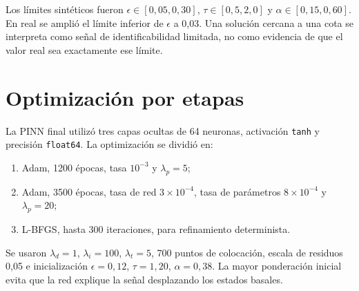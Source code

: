 Los límites sintéticos fueron $\epsilon\in[0{,}05,0{,}30]$, $\tau\in[0{,}5,2{,}0]$ y $\alpha\in[0{,}15,0{,}60]$. En real se amplió el límite inferior de $\epsilon$ a 0,03. Una solución cercana a una cota se interpreta como señal de identificabilidad limitada, no como evidencia de que el valor real sea exactamente ese límite.

\section{Optimización por etapas}
La PINN final utilizó tres capas ocultas de 64 neuronas, activación \texttt{tanh} y precisión \texttt{float64}. La optimización se dividió en:
\begin{enumerate}
  \item Adam, 1200 épocas, tasa $10^{-3}$ y $\lambda_p=5$;
  \item Adam, 3500 épocas, tasa de red $3\times10^{-4}$, tasa de parámetros $8\times10^{-4}$ y $\lambda_p=20$;
  \item L-BFGS, hasta 300 iteraciones, para refinamiento determinista.
\end{enumerate}

Se usaron $\lambda_d=1$, $\lambda_i=100$, $\lambda_t=5$, 700 puntos de colocación, escala de residuos 0,05 e inicialización $\epsilon=0{,}12$, $\tau=1{,}20$, $\alpha=0{,}38$. La mayor ponderación inicial evita que la red explique la señal desplazando los estados basales.
